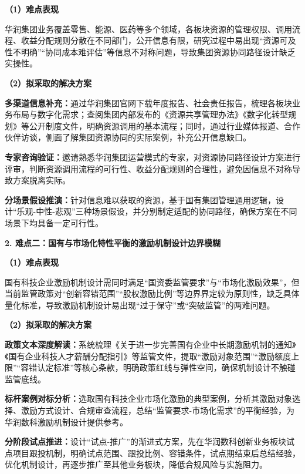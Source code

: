 \documentclass[UTF8, a4paper, 11pt]{ctexart}
\begin{document}
\begin{UnifiedBox}
\vspace{0.2cm}
\noindent \textbf{（1）难点表现}

华润集团业务覆盖零售、能源、医药等多个领域，各板块资源的管理权限、调用流程、收益分配规则分散在不同部门，公开信息有限，研究过程中易出现``资源可及性不明确''``协同成本难评估''等信息不对称问题，导致集团资源协同路径设计缺乏实操性。

\vspace{0.2cm}
\noindent \textbf{（2）拟采取的解决方案}

\noindent \textbf{多渠道信息补充：}通过华润集团官网下载年度报告、社会责任报告，梳理各板块业务布局与数字化需求；查阅集团内部发布的《资源共享管理办法》《数字化转型规划》等公开制度文件，明确资源调用的基本流程；同时，通过行业媒体报道、合作伙伴访谈，侧面了解集团资源协同的实际案例，补充公开信息缺口。

\noindent \textbf{专家咨询验证：}邀请熟悉华润集团运营模式的专家，对资源协同路径设计方案进行评审，判断资源调用流程的可行性、收益分配规则的合理性，避免因信息不对称导致方案脱离实际。

\noindent \textbf{分场景假设推演：}针对信息难以获取的资源，基于国有集团管理通用逻辑，设计``乐观-中性-悲观''三种场景假设，并分别制定适配的协同路径，确保方案在不同场景下均具备一定可行性。

\vspace{0.3cm}
\noindent \textbf{2. 难点二：国有与市场化特性平衡的激励机制设计边界模糊}

\vspace{0.2cm}
\noindent \textbf{（1）难点表现}

国有科技企业激励机制设计需同时满足``国资委监管要求''与``市场化激励效果''，但当前监管政策对``创新容错范围''``股权激励比例''等边界界定较为原则性，缺乏具体量化标准，导致激励机制设计易出现``过于保守''或``突破监管''的两难问题。

\vspace{0.2cm}
\noindent \textbf{（2）拟采取的解决方案}

\noindent \textbf{政策文本深度解读：}系统梳理《关于进一步完善国有企业中长期激励机制的通知》《国有企业科技人才薪酬分配指引》等监管文件，提取``激励对象范围''``激励额度上限''``容错认定标准''等核心条款，明确政策红线与弹性空间，确保机制设计不触碰监管底线。

\noindent \textbf{标杆案例对标分析：}选取国有科技企业市场化激励的典型案例，分析其激励对象选择、激励方式设计、合规审查流程，总结``监管要求-市场化需求''的平衡经验，为华润数科激励机制设计提供参考。

\noindent \textbf{分阶段试点推进：}设计``试点-推广''的渐进式方案，先在华润数科创新业务板块试点项目跟投机制，明确试点范围、跟投比例、容错条件，试点期结束后总结经验，优化机制设计，再逐步推广至其他业务板块，降低合规风险与实施阻力。


\end{UnifiedBox}
\end{document}
